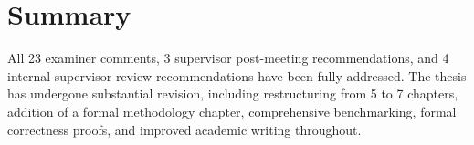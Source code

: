 \documentclass[12pt,a4paper]{article}
\begin{document}
\section*{Summary}

All 23 examiner comments, 3 supervisor post-meeting recommendations, and 4 internal supervisor review recommendations have been fully addressed. The thesis has undergone substantial revision, including restructuring from 5 to 7 chapters, addition of a formal methodology chapter, comprehensive benchmarking, formal correctness proofs, and improved academic writing throughout.
\end{document}

